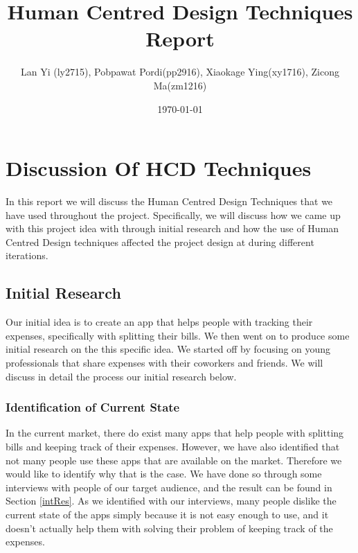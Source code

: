 \documentclass[a4wide, 11pt]{article}
\begin{document}
\title{Human Centred Design Techniques Report}

\author{Lan Yi (ly2715), Pobpawat Pordi(pp2916), Xiaokage Ying(xy1716), Zicong Ma(zm1216)}

\date{\today}         %

\maketitle            %

\section{Discussion Of HCD Techniques}

In this report we will discuss the Human Centred Design Techniques that we have used throughout the project. Specifically, we will discuss how we came up with this project idea with through initial research and how the use of Human Centred Design techniques affected the project design at during different iterations. 

\subsection{Initial Research} 


Our initial idea is to create an app that helps people with tracking their expenses, specifically with splitting their bills. We then went on to produce some initial research on the this specific idea. We started off by focusing on young professionals that share expenses with their coworkers and friends. We will discuss in detail the process our initial research below.

\subsubsection{Identification of Current State}

In the current market, there do exist many apps that help people with splitting bills and keeping track of their expenses. However, we have also identified that not many people use these apps that are available on the market. Therefore we would like to identify why that is the case. We have done so through some interviews with people of our target audience, and the result can be found in Section \ref{intRes}. As we identified with our interviews, many people dislike the current state of the apps simply because it is not easy enough to use, and it doesn't actually help them with solving their problem of keeping track of the expenses.
\end{document}
